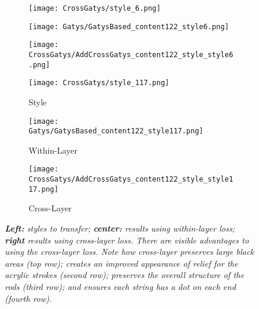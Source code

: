 \begin{figure}[!htbp]
    \begin{subfigure}[b]{0.3\linewidth}
      \texttt{[image: CrossGatys/style\_6.png]}
    \end{subfigure}
    \begin{subfigure}[b]{0.3\linewidth}
      \texttt{[image: Gatys/GatysBased\_content122\_style6.png]}
    \end{subfigure}
    \begin{subfigure}[b]{0.3\linewidth}
      \texttt{[image: CrossGatys/AddCrossGatys\_content122\_style\_style6.png]}
    \end{subfigure}
    \begin{subfigure}[b]{0.3\linewidth}
      \texttt{[image: CrossGatys/style\_117.png]}
  \caption{Style}
    \end{subfigure}
    \begin{subfigure}[b]{0.3\linewidth}
      \texttt{[image: Gatys/GatysBased\_content122\_style117.png]}
  \caption{Within-Layer}
    \end{subfigure}
    \begin{subfigure}[b]{0.3\linewidth}
      \texttt{[image: CrossGatys/AddCrossGatys\_content122\_style\_style117.png]}
  \caption{Cross-Layer}
    \end{subfigure}  
    \caption{\em {\bf Left:} styles to transfer; {\bf center:} results using within-layer
      loss; {\bf right} results using cross-layer loss.  There are
      visible advantages to using the cross-layer loss. Note how cross-layer preserves large black areas (top row); 
  creates an improved appearance of relief for the acrylic strokes (second row); preserves the overall structure of the
  rods (third row); and ensures each string has a dot on each end (fourth row).
    }\label{fig:cf1}
  \end{figure}
